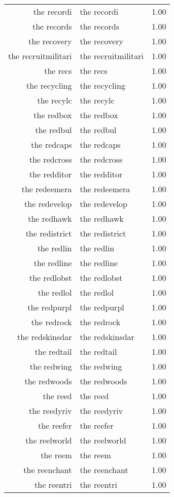 \begin{table}[ht]
\begin{tabular}{rlr}
  the recordi & the recordi & 1.00 \\ 
  the records & the records & 1.00 \\ 
  the recovery & the recovery & 1.00 \\ 
  the recruitmilitari & the recruitmilitari & 1.00 \\ 
  the recs & the recs & 1.00 \\ 
  the recycling & the recycling & 1.00 \\ 
  the recylc & the recylc & 1.00 \\ 
  the redbox & the redbox & 1.00 \\ 
  the redbul & the redbul & 1.00 \\ 
  the redcaps & the redcaps & 1.00 \\ 
  the redcross & the redcross & 1.00 \\ 
  the redditor & the redditor & 1.00 \\ 
  the redeemera & the redeemera & 1.00 \\ 
  the redevelop & the redevelop & 1.00 \\ 
  the redhawk & the redhawk & 1.00 \\ 
  the redistrict & the redistrict & 1.00 \\ 
  the redlin & the redlin & 1.00 \\ 
  the redline & the redline & 1.00 \\ 
  the redlobst & the redlobst & 1.00 \\ 
  the redlol & the redlol & 1.00 \\ 
  the redpurpl & the redpurpl & 1.00 \\ 
  the redrock & the redrock & 1.00 \\ 
  the redskinsdar & the redskinsdar & 1.00 \\ 
  the redtail & the redtail & 1.00 \\ 
  the redwing & the redwing & 1.00 \\ 
  the redwoods & the redwoods & 1.00 \\ 
  the reed & the reed & 1.00 \\ 
  the reedyriv & the reedyriv & 1.00 \\ 
  the reefer & the reefer & 1.00 \\ 
  the reelworld & the reelworld & 1.00 \\ 
  the reem & the reem & 1.00 \\ 
  the reenchant & the reenchant & 1.00 \\ 
  the reentri & the reentri & 1.00 \\ 

\end{tabular}
\end{table}
